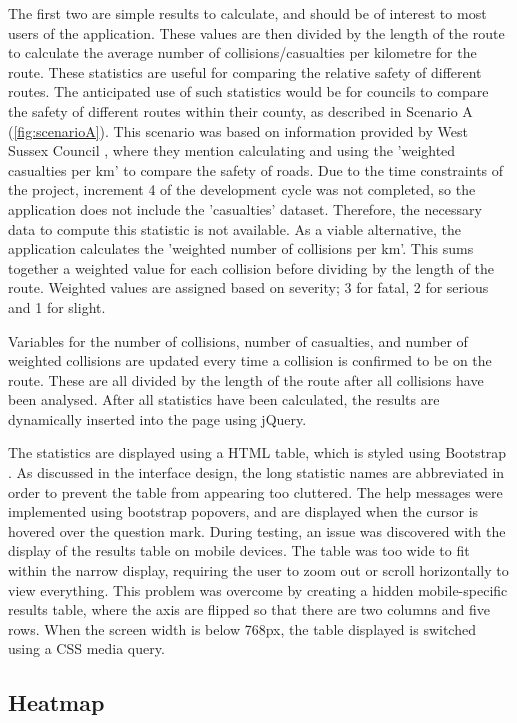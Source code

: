 \documentclass[authoryearcitations]{UoYCSproject}
\begin{document}
The first two are simple results to calculate, and should be of interest to most users of the application. These values are then divided by the length of the route to calculate the average number of collisions/casualties per kilometre for the route. These statistics are useful for comparing the relative safety of different routes. The anticipated use of such statistics would be for councils to compare the safety of different routes within their county, as described in Scenario A (\autoref{fig:scenarioA}). This scenario was based on information provided by West Sussex Council \citep{WestSussexCountyCouncil}, where they mention calculating and using the 'weighted casualties per km' to compare the safety of roads. Due to the time constraints of the project, increment 4 of the development cycle was not completed, so the application does not include the 'casualties' dataset. Therefore, the necessary data to compute this statistic is not available. As a viable alternative, the application calculates the 'weighted number of collisions per km'. This sums together a weighted value for each collision before dividing by the length of the route. Weighted values are assigned based on severity; 3 for fatal, 2 for serious and 1 for slight. 

Variables for the number of collisions, number of casualties, and number of weighted collisions are updated every time a collision is confirmed to be on the route. These are all divided by the length of the route after all collisions have been analysed. After all statistics have been calculated, the results are dynamically inserted into the page using jQuery.

The statistics are displayed using a HTML table, which is styled using Bootstrap \citep{Bootstrap}. As discussed in the interface design, the long statistic names are abbreviated in order to prevent the table from appearing too cluttered. The help messages were implemented using bootstrap popovers, and are displayed when the cursor is hovered over the question mark. During testing, an issue was discovered with the display of the results table on mobile devices. The table was too wide to fit within the narrow display, requiring the user to zoom out or scroll horizontally to view everything. This problem was overcome by creating a hidden mobile-specific results table, where the axis are flipped so that there are two columns and five rows. When the screen width is below 768px, the table displayed is switched using a CSS media query.

\subsection{Heatmap}
\end{document}
